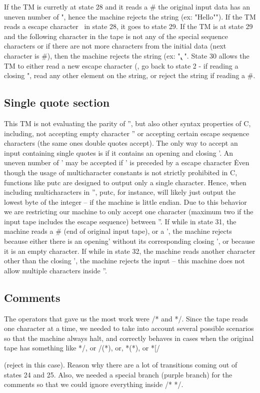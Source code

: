 \documentclass{article}
\begin{document}
{{If the TM is curretly at state 28 and it reads a # the original input data has an uneven number of ", hence the machine rejects the string (ex: "Hello""). 
If the TM reads a escape character \ in state 28, it goes to state 29. If the TM is at state 29 and the following character in the tape is not any of 
the special sequence characters or if there are not more characters from the initial data (next character is #), then the machine rejects the string 
(ex: "\k, "\). State 30 allows the TM to either read a new escape character (\), go back to state 2 - if reading a closing ", read any other element 
on the string, or reject the string if reading a #. 

\subsection{Single quote section}

This TM is not evaluating the parity of '', but also other syntax properties of C, including, not accepting empty character '' or accepting certain escape 
sequence characters (the same ones double quotes accept). The only way to accept an input containing single quotes is if it contains an opening and closing '. 
An uneven number of ' may be accepted if ' is preceded by a escape character \. Even though the usage of multicharacter constants is not strictly prohibited in C,
functions like putc are designed to output only a single character. Hence, when including multicharacters in '', putc, for instance, will likely just output the 
lowest byte of the integer – if the machine is little endian. Due to this behavior we are restricting our machine to only accept one character (maximum two if the 
input tape includes the escape sequence) between ''. If while in state 31, the machine reads a # (end of original input tape), or a ', the machine rejects because 
either there is an opening' without its corresponding closing ', or because it is an empty character. If while in state 32, the machine reads another character 
other than the closing ', the machine rejects the input – this machine does not allow multiple characters inside ''. 

\subsection{Comments}

The operators that gave us the most work were /* and */. Since the tape reads one character at a time, we needed to take into account several possible scenarios 
so that the machine always halt, and correctly behaves in cases when the original tape has something like *{/}, or /(*), or, *(*), or *[/} (reject in this case). 
Reason why there are a lot of transitions coming out of states 24 and 25. Also, we needed a special branch (purple branch) for the comments so that we could 
ignore everything inside /* */.

}
\end{document}

